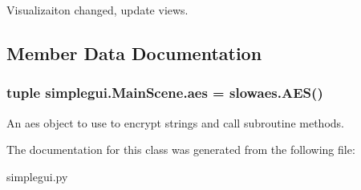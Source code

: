 Visualizaiton changed, update views. 



\subsection{Member Data Documentation}
\hypertarget{classsimplegui_1_1_main_scene_afc11de68b1f5e44d5831ca15698bbd69}{
\subsubsection[{aes}]{\setlength{\rightskip}{0pt plus 5cm}tuple simplegui.\-Main\-Scene.\-aes = {\bf slowaes.\-A\-E\-S}()\hspace{0.3cm}{\ttfamily [static]}}}\label{classsimplegui_1_1_main_scene_afc11de68b1f5e44d5831ca15698bbd69}


An aes object to use to encrypt strings and call subroutine methods. 



The documentation for this class was generated from the following file\-:\begin{DoxyCompactItemize}
\item 
simplegui.\-py\end{DoxyCompactItemize}
